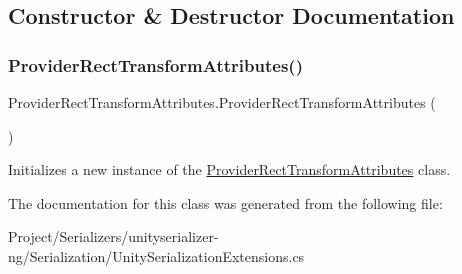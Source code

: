 \subsection{Constructor \& Destructor Documentation}
\mbox{\label{class_provider_rect_transform_attributes_af3af6982a65f46ed0caeed648dba3185}} 
\subsubsection{\texorpdfstring{Provider\+Rect\+Transform\+Attributes()}{ProviderRectTransformAttributes()}}
{\footnotesize\ttfamily Provider\+Rect\+Transform\+Attributes.\+Provider\+Rect\+Transform\+Attributes (\begin{DoxyParamCaption}{ }\end{DoxyParamCaption})\hspace{0.3cm}{\ttfamily [inline]}}



Initializes a new instance of the \hyperlink{class_provider_rect_transform_attributes}{Provider\+Rect\+Transform\+Attributes} class. 



The documentation for this class was generated from the following file\+:\begin{DoxyCompactItemize}
\item 
Project/\+Serializers/unityserializer-\/ng/\+Serialization/Unity\+Serialization\+Extensions.\+cs\end{DoxyCompactItemize}
